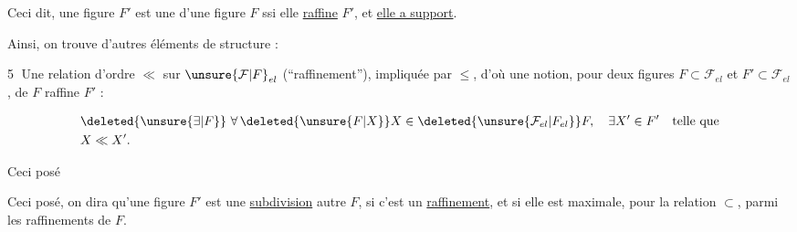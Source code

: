 
Ceci dit, une figure $F'$ est une  d'une figure $F$ ssi elle \uline{raffine} $F'$, et  \uline{elle a  support}. 

Ainsi, on trouve d'autres éléments de structure :

\textcircled{5} Une relation d'ordre $\ll$ sur $\unsure{\mathcal{F}|F}_{el}$ (``raffinement''), impliquée par $\leq$, d'où une notion, pour deux figures $F\subset\mathcal{F}_{el}$ et $F'\subset\mathcal{F}_{el}$, de $F$ raffine $F'$ :

\[
\begin{aligned}
&\deleted{\unsure{\exists|F}}\ \forall\,\deleted{\unsure{F|X}}X\in\deleted{\unsure{\mathcal{F}_{el}|F_{el}}}F,\quad \exists X'\in F'\quad\text{telle que}\\
&X\ll X'.
\end{aligned}
\]

Ceci posé





Ceci posé, on dira qu'une figure $F'$ est une \uline{subdivision}  autre $F$, si c'est un \uline{raffinement}, et si elle est maximale, pour la relation $\subset$, parmi les raffinements de $F$.
